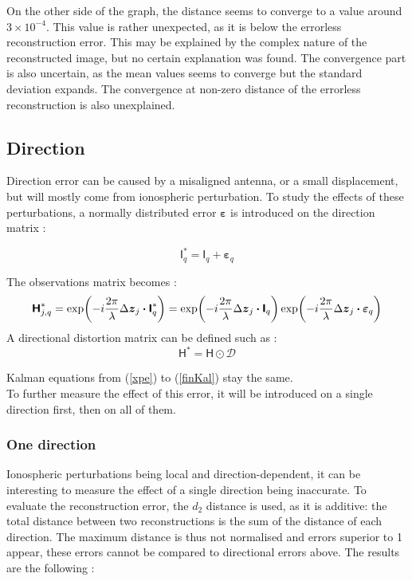\documentclass[titlepage]{article}
\renewcommand{\H}{\boldsymbol{\mathsf{H}}}
\newcommand{\I}{\boldsymbol{\mathsf{I}}}
\newcommand{\dz}{\Delta\boldsymbol{z}}
\newcommand{\vbeps}{\boldsymbol{\varepsilon}}
\newcommand{\D}{\mathcal{D}}
\begin{document}
	On the other side of the graph, the distance seems to converge to a value around $3\times10^{-4}$. This value is rather unexpected, as it is below the errorless reconstruction error. This may be explained by the complex nature of the reconstructed image, but no certain explanation was found. The convergence part is also uncertain, as the mean values seems to converge but the standard deviation expands. The convergence at non-zero distance of the errorless reconstruction is also unexplained.
	
	\subsection{Direction}
	
	Direction error can be caused by a misaligned antenna, or a small displacement, but will mostly come from ionospheric perturbation\cite{iono}. To study the effects of these perturbations, a normally distributed error $\vbeps$ is introduced on the direction matrix :
	
	\begin{equation}
		\I_q^* = \I_q + \vbeps_q
	\end{equation}

	The observations matrix becomes :
	$$
		\H_{j,q}^* = \exp(-i\frac{2\pi}{\lambda}\dz_{j}\dotproduct\I_q^*) = \exp(-i\frac{2\pi}{\lambda}\dz_{j}\dotproduct\I_q)\exp(-i\frac{2\pi}{\lambda}\dz_{j}\dotproduct\vbeps_q)
	$$
	A directional distortion matrix can be defined such as :
	\begin{equation}
		\H^* = \H \odot \D
	\end{equation}

	Kalman equations from (\ref{xpe}) to (\ref{finKal}) stay the same.\\
	
	To further measure the effect of this error, it will be introduced on a single direction first, then on all of them. 
	
	\subsubsection{One direction}
	
	Ionospheric perturbations being local and direction-dependent, it can be interesting to measure the effect of a single direction being inaccurate. To evaluate the reconstruction error, the $d_2$ distance is used, as it is additive: the total distance between two reconstructions is the sum of the distance of each direction. The maximum distance is thus not normalised and errors superior to 1 appear, these errors cannot be compared to directional errors above. The results are the following :
	
\end{document}
